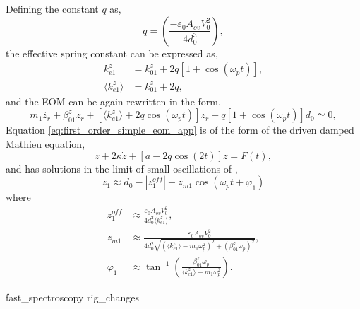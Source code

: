 \documentclass[12pt, a4paper, oneside]{book}
\begin{document}
Defining the constant $q$ as,
\begin{equation} q = \left(\frac{-\varepsilon_0 A_{ov} V_0^2}{4d_0^3}\right), \end{equation}
the effective spring constant can be expressed as,
\begin{align}
k_{e1}^z &= k_{01}^z + 2q \left[1+\cos(\omega_pt)\right],\\
\langle k_{e1}^{z} \rangle &= k_{01}^z + 2q,
\end{align}
and the EOM can be again rewritten in the form,
\begin{equation}
m_1\ddot{z_r} + \beta_{01}^z\dot{z_r} + \left[\langle k_{e1}^z\rangle + 2q\cos(\omega_pt)\right]z_r - q\left[1+\cos(\omega_pt)\right]d_0 \simeq 0,
\label{eq:first_order_simple_eom_app}
\end{equation}
Equation \eqref{eq:first_order_simple_eom_app} is of the form of the driven damped Mathieu equation,
\begin{equation} \ddot{z} + 2\kappa\dot{z} + [a - 2q\cos(2t)]z = F(t), \end{equation}
and has solutions in the limit of small oscillations of \cite{savage2012thesis},
\begin{equation}
z_1 \approx d_0 - \left|z_{1}^{off}\right| - z_{m1}\cos(\omega_pt+\varphi_1)
\label{eq:tip_oscillation_app}
\end{equation}
where
\begin{subequations}
\begin{align}
z_1^{off} &\approx %
\frac{ \varepsilon_0 A_{ov} V_0^2 }{ 4d_0^2 \langle k_{e1}^z \rangle }, \label{eq:tip_amp_app}\\
%
z_{m1} &\approx %
\frac{ \varepsilon_0 A_{ov} V_0^2 }%
{ 4d_0^2 \sqrt{ (\langle k_{e1}^z \rangle - m_1\omega_p^2)^2 + (\beta_{01}^z\omega_p)^2  } }, \\
%
\varphi_1 &\approx \tan^{-1}\left(\frac{\beta_{01}^{z}\omega_{p}}{\langle k_{e1}^{z} \rangle -m_{1}\omega_{p}^{2}}\right). \label{eq:tip_phase_app}
\end{align}
\end{subequations}

{fast_spectroscopy}
{rig_changes}

\begin{singlespace}
\printbibliography[category=appendices, resetnumbers=true, title={Supplementary Bibliography}]
\end{singlespace}
\end{document}
